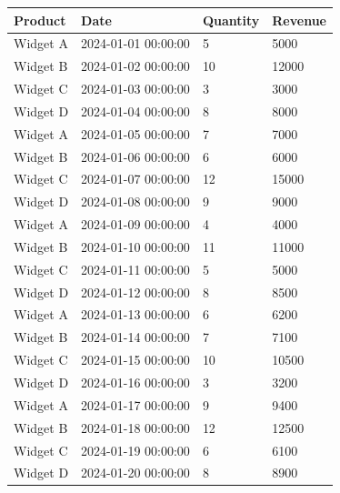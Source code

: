 \documentclass[11pt,a4paper]{article}
\begin{document}
\begin{table}[h]
\begin{tabular}{|l|l|l|l|}
\hline
Product & Date & Quantity & Revenue \\ \hline
Widget A & 2024-01-01 00:00:00 & 5 & 5000 \\ \hline
Widget B & 2024-01-02 00:00:00 & 10 & 12000 \\ \hline
Widget C & 2024-01-03 00:00:00 & 3 & 3000 \\ \hline
Widget D & 2024-01-04 00:00:00 & 8 & 8000 \\ \hline
Widget A & 2024-01-05 00:00:00 & 7 & 7000 \\ \hline
Widget B & 2024-01-06 00:00:00 & 6 & 6000 \\ \hline
Widget C & 2024-01-07 00:00:00 & 12 & 15000 \\ \hline
Widget D & 2024-01-08 00:00:00 & 9 & 9000 \\ \hline
Widget A & 2024-01-09 00:00:00 & 4 & 4000 \\ \hline
Widget B & 2024-01-10 00:00:00 & 11 & 11000 \\ \hline
Widget C & 2024-01-11 00:00:00 & 5 & 5000 \\ \hline
Widget D & 2024-01-12 00:00:00 & 8 & 8500 \\ \hline
Widget A & 2024-01-13 00:00:00 & 6 & 6200 \\ \hline
Widget B & 2024-01-14 00:00:00 & 7 & 7100 \\ \hline
Widget C & 2024-01-15 00:00:00 & 10 & 10500 \\ \hline
Widget D & 2024-01-16 00:00:00 & 3 & 3200 \\ \hline
Widget A & 2024-01-17 00:00:00 & 9 & 9400 \\ \hline
Widget B & 2024-01-18 00:00:00 & 12 & 12500 \\ \hline
Widget C & 2024-01-19 00:00:00 & 6 & 6100 \\ \hline
Widget D & 2024-01-20 00:00:00 & 8 & 8900 \\ \hline
\end{tabular}
\end{table}
\end{document}
